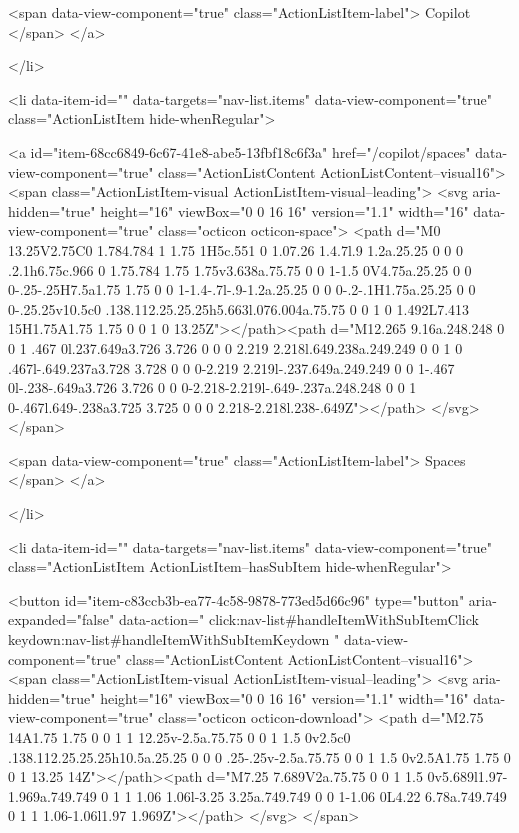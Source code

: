         <span data-view-component="true" class="ActionListItem-label">
          Copilot
</span>      
</a>
  
</li>

        
          
<li data-item-id="" data-targets="nav-list.items" data-view-component="true" class="ActionListItem hide-whenRegular">
    
    
    <a id="item-68cc6849-6c67-41e8-abe5-13fbf18c6f3a" href="/copilot/spaces" data-view-component="true" class="ActionListContent ActionListContent--visual16">
        <span class="ActionListItem-visual ActionListItem-visual--leading">
          <svg aria-hidden="true" height="16" viewBox="0 0 16 16" version="1.1" width="16" data-view-component="true" class="octicon octicon-space">
    <path d="M0 13.25V2.75C0 1.784.784 1 1.75 1H5c.551 0 1.07.26 1.4.7l.9 1.2a.25.25 0 0 0 .2.1h6.75c.966 0 1.75.784 1.75 1.75v3.638a.75.75 0 0 1-1.5 0V4.75a.25.25 0 0 0-.25-.25H7.5a1.75 1.75 0 0 1-1.4-.7l-.9-1.2a.25.25 0 0 0-.2-.1H1.75a.25.25 0 0 0-.25.25v10.5c0 .138.112.25.25.25h5.663l.076.004a.75.75 0 0 1 0 1.492L7.413 15H1.75A1.75 1.75 0 0 1 0 13.25Z"></path><path d="M12.265 9.16a.248.248 0 0 1 .467 0l.237.649a3.726 3.726 0 0 0 2.219 2.218l.649.238a.249.249 0 0 1 0 .467l-.649.237a3.728 3.728 0 0 0-2.219 2.219l-.237.649a.249.249 0 0 1-.467 0l-.238-.649a3.726 3.726 0 0 0-2.218-2.219l-.649-.237a.248.248 0 0 1 0-.467l.649-.238a3.725 3.725 0 0 0 2.218-2.218l.238-.649Z"></path>
</svg>
        </span>
      
        <span data-view-component="true" class="ActionListItem-label">
          Spaces
</span>      
</a>
  
</li>

        
          
<li data-item-id="" data-targets="nav-list.items" data-view-component="true" class="ActionListItem ActionListItem--hasSubItem hide-whenRegular">
    
    
    <button id="item-c83ccb3b-ea77-4c58-9878-773ed5d66c96" type="button" aria-expanded="false" data-action="
            click:nav-list#handleItemWithSubItemClick
            keydown:nav-list#handleItemWithSubItemKeydown
          " data-view-component="true" class="ActionListContent ActionListContent--visual16">
        <span class="ActionListItem-visual ActionListItem-visual--leading">
          <svg aria-hidden="true" height="16" viewBox="0 0 16 16" version="1.1" width="16" data-view-component="true" class="octicon octicon-download">
    <path d="M2.75 14A1.75 1.75 0 0 1 1 12.25v-2.5a.75.75 0 0 1 1.5 0v2.5c0 .138.112.25.25.25h10.5a.25.25 0 0 0 .25-.25v-2.5a.75.75 0 0 1 1.5 0v2.5A1.75 1.75 0 0 1 13.25 14Z"></path><path d="M7.25 7.689V2a.75.75 0 0 1 1.5 0v5.689l1.97-1.969a.749.749 0 1 1 1.06 1.06l-3.25 3.25a.749.749 0 0 1-1.06 0L4.22 6.78a.749.749 0 1 1 1.06-1.06l1.97 1.969Z"></path>
</svg>
        </span>
      
